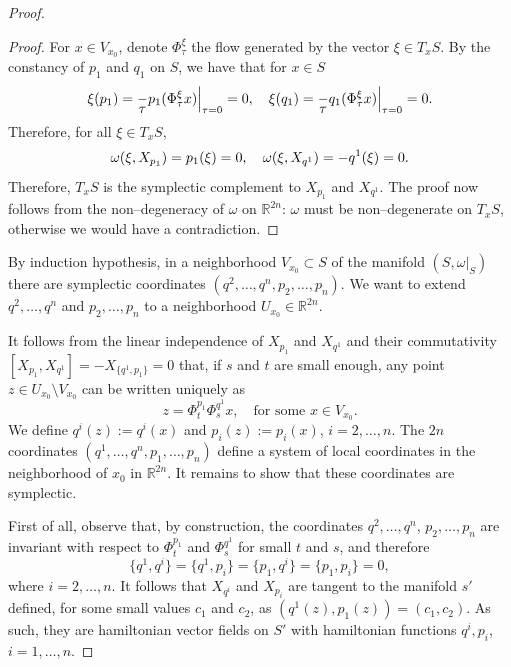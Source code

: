 \documentclass[english,fontsize=11pt,paper=a5,oneside]{scrbook}
\newcommand{\R}{\mathbb{R}}
\let\d\relax
\newcommand{\d}{\mathrm{d}}
\theoremstyle{definition}
\begin{document}
\begin{proof}
\begin{proof}
    For $x\in V_{x_0}$, denote $\Phi_\tau^\xi$ the flow generated by the vector $\xi\in T_x S$.
    By the constancy of $p_1$ and $q_1$ on $S$, we have that for $x\in S$
    \begin{equation}
      \xi(p_1) = \frac{\d}{\d\tau} p_1(\Phi_\tau^\xi x)\Big|_{\tau=0} = 0, \quad
      \xi(q_1) = \frac{\d}{\d\tau} q_1(\Phi_\tau^\xi x)\Big|_{\tau=0} = 0.
    \end{equation}
    Therefore, for all $\xi \in T_x S$,
    \begin{equation}
      \omega(\xi, X_{p_1}) = \d p_1(\xi) = 0,\quad
      \omega(\xi, X_{q^1}) = -\d q^1(\xi) = 0.
    \end{equation}
    Therefore, $T_x S$ is the symplectic complement to $X_{p_1}$ and $X_{q^1}$.
    The proof now follows from the non--degeneracy of $\omega$ on $\R^{2n}$: $\omega$ must be non--degenerate on $T_x S$, otherwise we would have a contradiction.
  \end{proof}

  By induction hypothesis, in a neighborhood $V_{x_0}\subset S$ of the manifold $(S, \omega|_S)$ there are symplectic coordinates $(q^2, \ldots, q^n, p_2, \ldots, p_n)$. We want to extend $q^2, \ldots, q^n$ and $p_2, \ldots, p_n$ to a neighborhood $U_{x_0}\in\R^{2n}$.

  It follows from the linear independence of $X_{p_1}$ and $X_{q^1}$ and their commutativity $[X_{p_1}, X_{q^1}] = -X_{\big\{q^1,p_1\big\}} = 0$ that, if $s$ and $t$ are small enough, any point $z\in U_{x_0}\setminus V_{x_0}$ can be written uniquely as
  \begin{equation}
    z = \Phi_t^{p_1}\Phi_s^{q^1} x, \quad\mbox{for some }x\in V_{x_0}.
  \end{equation}
  We define $q^i(z) := q^i(x)$ and $p_i(z) := p_i(x)$, $i=2,\ldots,n$.
  The $2n$ coordinates $(q^1, \ldots, q^n, p_1, \ldots, p_n)$ define a system of local coordinates in the neighborhood of $x_0$ in $\R^{2n}$. It remains to show that these coordinates are symplectic.

  First of all, observe that, by construction, the coordinates $q^2, \ldots, q^n$, $p_2, \ldots, p_n$ are invariant with respect to $\Phi_t^{p_1}$ and $\Phi_s^{q^1}$ for small $t$ and $s$, and therefore
  \begin{equation}
    \big\{q^1, q^i\big\} = \big\{q^1, p_i\big\} = \big\{p_1, q^i\big\} = \big\{p_1, p_i\big\} = 0,
  \end{equation}
  where $i = 2,\ldots,n$.
  It follows that $X_{q^i}$ and $X_{p_i}$ are tangent to the manifold $s'$ defined, for some small values $c_1$ and $c_2$, as $(q^1(z), p_1(z)) = (c_1, c_2)$.
  As such, they are hamiltonian vector fields on $S'$ with hamiltonian functions $q^i, p_i$, $i=1,\ldots,n$.


\end{proof}
\end{document}
